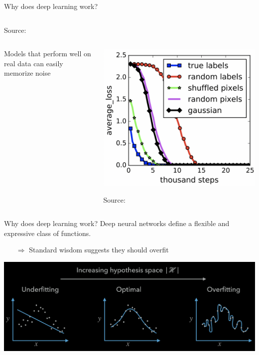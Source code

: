 \documentclass[10pt, aspectratio=169]{beamer}
\begin{document}
\begin{frame}[t]{Why does deep learning work?}
\begin{columns}
\begin{column}{0.4\linewidth}
\begin{center}
\vspace{-0.2cm}
{\scriptsize Source: \citep{canziani2016analysis}}
\end{center}
\end{column}
\end{columns}
\pause
\begin{columns}
\begin{column}{0.5\linewidth}
Models that perform well on real data can easily memorize noise%
\vspace{0.4cm}
\end{column}
\begin{column}{0.4\linewidth}
\begin{center}
    \includegraphics[width=0.55\linewidth]{part-4-images/random-labels.png} 
        
\vspace{-0.2cm}
{\scriptsize Source: \citep{zhang2021understanding}}
\end{center}
\end{column}
\end{columns}
\end{frame}
\begin{frame}[t]{Why does deep learning work?}
Deep neural networks define a flexible and expressive class of functions.
\begin{itemize}
    \item[$\Rightarrow$] Standard wisdom suggests they should overfit 
\end{itemize}
\begin{center}
    \includegraphics[width=\linewidth]{part-4-images/overfitting.png} 
\end{center}
\end{frame}
\end{document}
